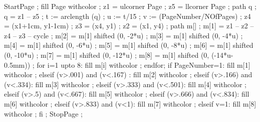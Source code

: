 StartPage ;
fill Page withcolor  ;
z1 = ulcorner Page ;
z5 = llcorner Page ;
path q ;
q = z1 -- z5 ;
t := arclength (q) ;
u := t/15 ;
v := (PageNumber/NOfPages) ;
z4 = (x1+1cm, y1-1cm) ;
z3 = (x4, y1) ;
z2 = (x1, y4) ;
path m[] ;
m[1] = z1 -- z2 -- z4 -- z3 -- cycle ;
m[2] = m[1] shifted (0, -2*u) ;
m[3] = m[1] shifted (0, -4*u) ;
m[4] = m[1] shifted (0, -6*u) ;
m[5] = m[1] shifted (0, -8*u) ;
m[6] = m[1] shifted (0, -10*u) ;
m[7] = m[1] shifted (0, -12*u) ;
m[8] = m[1] shifted (0, (-14*u-0.5mm)) ;
for i=1 upto 8:
	fill m[i] withcolor ;
endfor;
if PageNumber=1:
	fill m[1] withcolor  ;
elseif (v>.001) and (v<.167) :
	fill m[2] withcolor  ;	
elseif (v>.166) and (v<.334):
	fill m[3] withcolor  ;	
elseif (v>.333) and (v<.501):
	fill m[4] withcolor  ;	
elseif (v>.5) and (v<.667):
	fill m[5] withcolor  ;	
elseif (v>.666) and (v<.834):
	fill m[6] withcolor  ;	
elseif (v>.833) and (v<1):
	fill m[7] withcolor  ;	
elseif v=1:
	fill m[8] withcolor  ;
fi ;
StopPage ;
\stopuseMPgraphic 







\setupTitle[\c!headcolor={simpleslides:contrastcolor}]


\setupSlideTitle
   [\c!after=,
    \c!alternative=layer,
    \c!width=\textwidth,
    \c!align=\v!center,
    \c!height=2.5cm,
    \c!color=simpleslides:contrastcolor]


\setupTitle
  [\c!title\c!color={simpleslides:contrastcolor},
   \c!author\c!color={simpleslides:contrastcolor},
   \c!date\c!color={simpleslides:contrastcolor}]

\setupcombinations[distance=0cm]


\setupitemize[1][inmargin][color=simpleslides:itemize:color]

\protect
\stopmodule

\endinput

